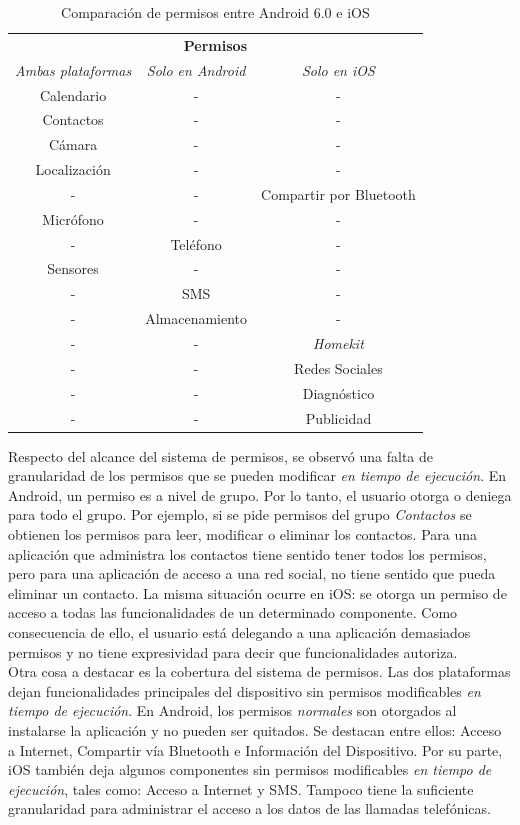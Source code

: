\begin{table}[tbp]
	\center
	\begin{tabular}{c c c}
		\hline
		\multicolumn{3}{c}{\textbf{Permisos}} \\
		\emph{Ambas plataformas} 	& \emph{Solo en Android}	& \emph{Solo en iOS} \\ \hline    \hline
		Calendario	& -		& -	\\						
		Contactos	& -				& - \\						
		Cámara		& -				& -	\\						
		Localización& -				& -	\\						
		-			& -				& Compartir por Bluetooth\\ 
		Micrófono   & -				& - \\						
		-			& Teléfono		& -	\\						
		Sensores    & -    			& - \\						
		-			& SMS			& - \\						
		-			& Almacenamiento& - \\						
		-			& -				& \emph{Homekit} \\			
		-			& -				& Redes Sociales \\        	
		-			& -				& Diagnóstico \\        			
		-			& -				& Publicidad \\    			\hline
	\end{tabular}
	\caption{Comparación de permisos entre Android 6.0 e iOS}
	\label{tab:chapter03:compPerm}
\end{table}
Respecto del alcance del sistema de permisos, se observó una falta de granularidad de los permisos que se pueden modificar \emph{en tiempo de ejecución}. En Android, un permiso es a nivel de grupo. Por lo tanto, el usuario otorga o deniega para todo el grupo. Por ejemplo, si se pide permisos del grupo \emph{Contactos} se obtienen los permisos para leer, modificar o eliminar los contactos. Para  una aplicación que administra los contactos tiene sentido tener todos los permisos, pero para una aplicación de acceso a una red social, no tiene sentido que pueda eliminar un contacto. La misma situación ocurre en iOS: se otorga un permiso de acceso a todas las funcionalidades de un determinado componente. Como consecuencia de ello, el usuario está delegando a una aplicación demasiados permisos y no tiene expresividad para decir que funcionalidades autoriza.\\

Otra cosa a destacar es la cobertura del sistema de permisos. Las dos plataformas dejan funcionalidades principales del dispositivo sin permisos modificables \emph{en tiempo de ejecución}. En Android, los permisos \emph{normales} son otorgados al instalarse la aplicación y no pueden ser quitados. Se destacan entre ellos: Acceso a Internet, Compartir vía Bluetooth e Información del Dispositivo. Por su parte, iOS también deja algunos componentes sin permisos modificables \emph{en tiempo de ejecución}, tales como: Acceso a Internet y SMS. Tampoco tiene la suficiente granularidad para administrar el acceso a los datos de las llamadas telefónicas.\\

